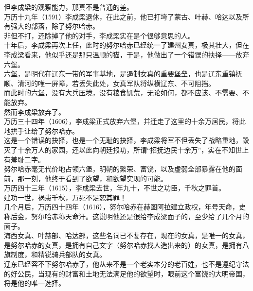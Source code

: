 \begin{multicols}{\theparacolNo}
但李成梁的观察能力，那真不是普通的差。\\

万历十九年（1591）李成梁退休，在此之前，他已打垮了蒙古、叶赫、哈达以及所有强大的部落，除了努尔哈赤。\\

非但不打，还除掉了他的对手，李成梁实在是个很够意思的人。\\

十年后，李成梁再次上任，此时的努尔哈赤已经统一了建州女真，极其壮大，但在李成梁看来，他似乎还是那只温顺的猫，于是，他做出了一个错误的抉择——放弃六堡。\\

六堡，是明代在辽东一带的军事基地，是遏制女真的重要堡垒，也是辽东重镇抚顺、清河的唯一屏障，若丢失此处，女真军队将纵横辽东、不可阻挡。\\

而此时的六堡，没有大兵压境，没有粮食饥荒，无论如何，都不应该、不需要、不能放弃。\\

然而李成梁放弃了。\\

万历三十四年（1606），李成梁正式放弃六堡，并迁走了这里的十余万居民，将此地拱手让给了努尔哈赤。\\

这是一个错误的抉择，也是一个无耻的抉择，李成梁将军不但丢失了战略重地，毁灭了十余万人的家园，还以此向朝廷报功，所谓“招抚边民十余万”，实在不知世上有羞耻二字。\\

努尔哈赤毫无代价地占领六堡，明朝的繁荣、富饶，以及虚弱全部暴露在他的面前，那一刻，他终于看到了欲望，和欲望实现的可能。\\

万历四十三年（1615），李成梁去世，年九十，不世之功臣，千秋之罪首。\\

建功一世，祸患千秋，万死不足恕其罪！\\

几个月后，万历四十四年（1616），努尔哈赤在赫图阿拉建立政权，年号天命，史称后金，努尔哈赤称天命汗。这说明他还是很给李成梁面子的，至少给了几个月的面子。\\

海西女真、叶赫部、哈达部，这些名词已不复存在，现在的女真，是唯一的女真，是努尔哈赤的女真，是拥有自己文字（努尔哈赤找人造出来的）的女真，是拥有八旗制度，和精锐骑兵部队的女真。\\

辽东已经容不下努尔哈赤了，他从来不是一个老实本分的老百姓，也不是遵纪守法的好公民，当现有的财富和土地无法满足他的欲望时，眼前这个富饶的大明帝国，将是他的唯一选择。\\


\end{multicols}
